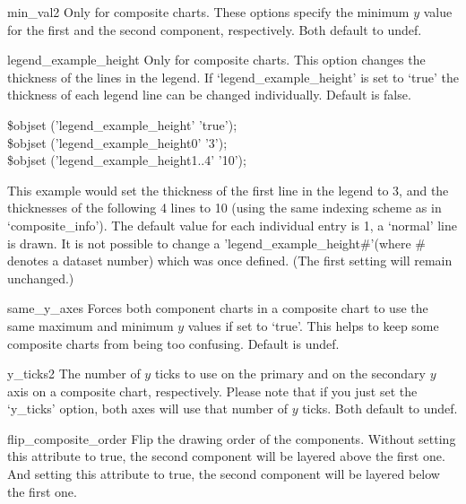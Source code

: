 \begin{AttrDecl}{min\_val2}
Only for composite charts. These options specify the minimum $y$ value
for the first and the second component, respectively. Both default to
undef.
\end{AttrDecl}

\begin{AttrDecl}{legend\_example\_height}
Only for composite charts. This option changes the thickness of the
lines in the legend. If `legend\_example\_height' is set to `true' the
thickness of each legend line can be changed individually. Default is
false. \Eg
\begin{SmallExample}
\$obj\deref set ('legend\_example\_height'     \fatcomma 'true');\\
\$obj\deref set ('legend\_example\_height0'    \fatcomma '3');\\
\$obj\deref set ('legend\_example\_height1..4' \fatcomma '10');
\end{SmallExample}

This example would set the thickness of the first line in the legend to
3, and the thicknesses of the following 4 lines to 10 (using the same
indexing scheme as in `composite\_info'). The default value for each
individual entry is 1, \ie a `normal' line is drawn. It is not possible
to change a 'legend\_example\_height\#'(where \# denotes a dataset
number) which was once defined. (The first setting will remain
unchanged.)
\end{AttrDecl}

\begin{AttrDecl}{same\_y\_axes}
Forces both component charts in a composite chart to use the same
maximum and minimum $y$ values if set to `true'. This helps to keep
some composite charts from being too confusing. Default is undef.
\end{AttrDecl}

\begin{AttrDecl}{y\_ticks2}
The number of $y$ ticks to use on the primary and on the secondary $y$
axis on a composite chart, respectively. Please note that if you just
set the `y\_ticks' option, both axes will use that number of $y$ ticks.
Both default to undef.
\end{AttrDecl}

\begin{AttrDecl}{flip\_composite\_order}
Flip the drawing order of the components.
Without setting this attribute to true,
the second component will be layered above the first one.
And setting this attribute to true,
the second component will be layered below the first one.
\end{AttrDecl}
